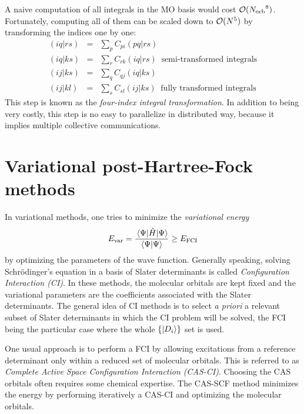 \documentclass[./thesis.tex]{subfiles}
\begin{document}
A naive computation of all integrals in the MO basis would cost ${\cal O}({N_\text{orb}}^8)$. Fortunately, computing all of them can be scaled down to ${\cal O}(N^5)$ by transforming the indices one by one:\cite{Wilson_1987}
\begin{eqnarray}
(iq\vert rs) & = & \sum_{p} C_{pi} (pq|rs) \nonumber \\ 
(iq\vert ks) & = & \sum_{r} C_{rk} (iq|rs) \;\; \text{semi-transformed integrals} \\
(ij\vert ks) & = & \sum_{q} C_{qj} (iq|ks) \nonumber \\ 
(ij\vert kl) & = & \sum_{s} C_{sl} (ij|ks)  \;\; \text{fully transformed integrals}
\end{eqnarray}
This step is known as the \emph{four-index integral transformation}.  
In addition to being very costly, this step is no easy to parallelize in
distributed way, because it implies multiple collective communications.\cite{Rajbhandari_2017,Limaye_1994,Fletcher_1999,Covick_1990}



\section{Variational post-Hartree-Fock methods}

In variational methods, one tries to minimize the \emph{variational energy}
\begin{equation}
E_\text{var} = \frac{\mel{\Psi}{\hat{H}}{\Psi}}{\braket{\Psi}{\Psi}} \ge E_\text{FCI}
\label{eq:evar}
\end{equation}
by optimizing the parameters of the wave function.
Generally speaking, solving Schrö\-dinger's equation in a basis of Slater determinants is called \emph{Configuration Interaction (CI)}.
In these methods, the molecular orbitals are kept fixed and the variational parameters are the coefficients associated with the Slater determinants.
The general idea of CI methods is to select \textit{a priori} a relevant subset
of Slater determinants in which the CI problem will be solved, the FCI being
the particular case where the whole $\{\ket {D_i} \}$ set is used.

One usual approach is to perform a FCI by allowing excitations from a reference determinant only within a reduced set of molecular orbitals. This is referred to as \emph{Complete Active Space Configuration Interaction (CAS-CI)}. Choosing the CAS orbitals often requires some chemical expertise. The CAS-SCF method minimizes the energy by performing iteratively a CAS-CI and optimizing the molecular orbitals.
\end{document}
